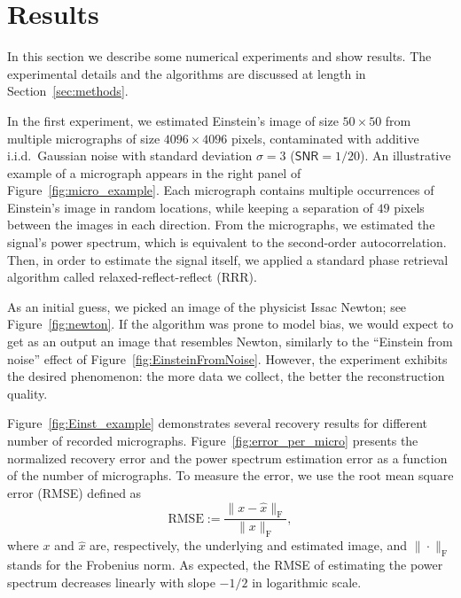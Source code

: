 \documentclass[english,11pt]{article}
\newcommand{\1}{\mathbf{1}}
\newcommand{\TODO}[1]{{\color{red}{[#1]}}}
\numberwithin{equation}{section}
\theoremstyle{plain}
\theoremstyle{definition}
\theoremstyle{remark}
\theoremstyle{plain}
\theoremstyle{remark}
\theoremstyle{plain}
\theoremstyle{plain}
\newcommand{\SNR}{\ensuremath{\textsf{SNR}}}
\begin{document}
\section{Results} \label{sec:results}

In this section we describe  some numerical experiments and show results. The experimental details and the algorithms are discussed at length in Section~\ref{sec:methods}.

In the first experiment, we estimated Einstein's image of size $50\times 50$ from multiple micrographs of size $4096\times 4096$ pixels, contaminated  with additive i.i.d.\ Gaussian noise with standard deviation $\sigma=3$ ($\SNR=1/20$). An illustrative example of a micrograph appears in the right panel of Figure~\ref{fig:micro_example}.
Each micrograph contains multiple occurrences of Einstein's image  in random locations, while keeping a separation of  $49$ pixels between the images in each direction. From the micrographs, we estimated the signal's power spectrum, which is equivalent to the second-order autocorrelation. Then, in order to estimate the signal itself, we applied a standard phase retrieval algorithm called relaxed-reflect-reflect (RRR).

As an initial guess, we picked an image of the physicist Issac Newton; see Figure~\ref{fig:newton}. If the algorithm was prone to model bias, we would expect to get as an output an image that resembles Newton, similarly to the ``Einstein from noise'' effect of Figure~\ref{fig:EinsteinFromNoise}. However, the experiment exhibits the desired phenomenon: the more data we collect, the better the reconstruction quality. 

Figure~\ref{fig:Einst_example} demonstrates several recovery results for different number of recorded micrographs. Figure~\ref{fig:error_per_micro} presents the normalized recovery error and the power spectrum estimation error as a function of the number of micrographs.
To measure the error, we use the root mean square error (RMSE) defined as 
\begin{equation}
\text{RMSE}  := \frac{\|x - \hat{x}\|_{\text{F}}}{\|x \|_{\text{F}}},
\end{equation} 
where $x$ and $\hat{x}$ are, respectively, the underlying and estimated image, and $\|\cdot\|_{\text{F}}$ stands for the Frobenius norm. 
As expected, the RMSE of estimating the power spectrum   decreases linearly with slope $-1/2$ in logarithmic scale. 
\TODO{Few comments: 1. We have a movie in the supplementary material. 2. Does the error also have the right slope? 3. We can put more images to exemplify the progress 4. Need to improve the micrograph's generation code  }
\end{document}
